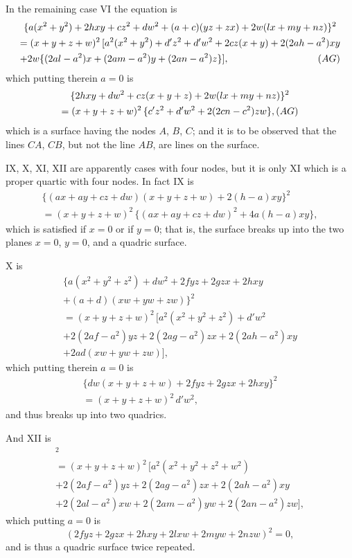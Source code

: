 \documentclass[11pt,a4paper]{article}
\begin{document}
In the remaining case VI the equation is
\begin{multline*}
\{a(x^{2}+y^{2}) + 2hxy + cz^{2} + dw^{2} + (a+c)(yz+zx) + 2w(lx+my+nz)\}^{2}\\
= (x+y+z+w)^{2}\, [a^{2}(x^{2}+y^{2}) + d'z^{2} + d'w^{2} + 2cz(x+y) + 2(2ah-a^{2})xy\\
+ 2w\{(2al-a^{2})x + (2am-a^{2})y + (2an-a^{2})z\}],\hfill(AG)
\end{multline*}
which putting therein $a=0$ is
\begin{multline*}
\{2hxy + dw^{2} + cz(x+y+z) + 2w(lx+my+nz)\}^{2}\\
= (x+y+z+w)^{2}\, \{c'z^{2} + d'w^{2} + 2(2cn-c^{2})zw\},\hfill(AG)
\end{multline*}
which is a surface having the nodes $A$, $B$, $C$; and it is to be observed that the lines $CA$, $CB$, but not the line $AB$, are lines on the surface.

IX, X, XI, XII are apparently cases with four nodes, but it is only XI which is a proper quartic with four nodes. In fact IX is
\begin{multline*}
\{(ax+ay+cz+dw)(x+y+z+w) + 2(h-a)xy\}^{2}\\
= (x+y+z+w)^{2}\, \{(ax+ay+cz+dw)^{2} + 4a(h-a)xy\},
\end{multline*}
which is satisfied if $x=0$ or if $y=0$; that is, the surface breaks up into the two planes $x=0$, $y=0$, and a quadric surface.

X is
\begin{multline*}
\{a(x^{2}+y^{2}+z^{2}) + dw^{2} + 2fyz + 2gzx + 2hxy\\
+ (a+d)(xw+yw+zw)\}^{2}\\
= (x+y+z+w)^{2}\, [a^{2}(x^{2}+y^{2}+z^{2}) + d'w^{2}\\
+ 2(2af-a^{2})yz + 2(2ag-a^{2})zx + 2(2ah-a^{2})xy\\
+ 2ad(xw+yw+zw)],
\end{multline*}
which putting therein $a=0$ is
\begin{multline*}
\{dw(x+y+z+w) + 2fyz + 2gzx + 2hxy\}^{2}\\
= (x+y+z+w)^{2}\, d'w^{2},
\end{multline*}
and thus breaks up into two quadrics.

And XII is
\begin{multline*}
[a^{2}(x^{2}+y^{2}+z^{2}+w^{2}) + 2fyz + 2gzx + 2hxy + 2lxw + 2myw + 2nzw]^{2}\\
= (x+y+z+w)^{2}\, [a^{2}(x^{2}+y^{2}+z^{2}+w^{2})\\
+ 2(2af-a^{2})yz + 2(2ag-a^{2})zx + 2(2ah-a^{2})xy\\
+ 2(2al-a^{2})xw + 2(2am-a^{2})yw + 2(2an-a^{2})zw],
\end{multline*}
which putting $a=0$ is
\[
(2fyz + 2gzx + 2hxy + 2lxw + 2myw + 2nzw)^{2} = 0,
\]
and is thus a quadric surface twice repeated.
\end{document}
